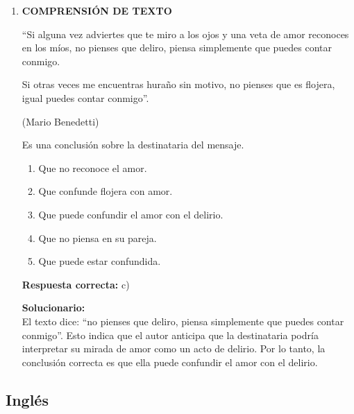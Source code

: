 \begin{enumerate}
	\vspace{2mm}
	\textbf{Solucionario:}\\
	Un orden expositivo general razonable es: antecedentes, definición, características, tipos o clases y conclusión:
	
	$III - V - IV - II - I$
	
	\vspace{6mm}
	
	\item \textbf{COMPRENSIÓN DE TEXTO}
	
	“Si alguna vez adviertes que te miro a los ojos y una veta de amor reconoces en los míos, no pienses que deliro, piensa simplemente que puedes contar conmigo.
	
	Si otras veces me encuentras huraño sin motivo, no pienses que es flojera, igual puedes contar conmigo”.
	
	\hfill (Mario Benedetti)
	
	Es una conclusión sobre la destinataria del mensaje.
	\begin{enumerate}[label=\alph*)]
		\item Que no reconoce el amor.
		\item Que confunde flojera con amor.
		\item Que puede confundir el amor con el delirio.
		\item Que no piensa en su pareja.
		\item Que puede estar confundida.
	\end{enumerate}
	\textbf{Respuesta correcta:} c)
	
	\vspace{2mm}
	\textbf{Solucionario:}\\
	El texto dice: “no pienses que deliro, piensa simplemente que puedes contar conmigo”. Esto indica que el autor anticipa que la destinataria podría interpretar su mirada de amor como un acto de delirio. Por lo tanto, la conclusión correcta es que ella puede confundir el amor con el delirio.
	
	\vspace{6mm}
	
\end{enumerate}

\subsection*{Inglés}

